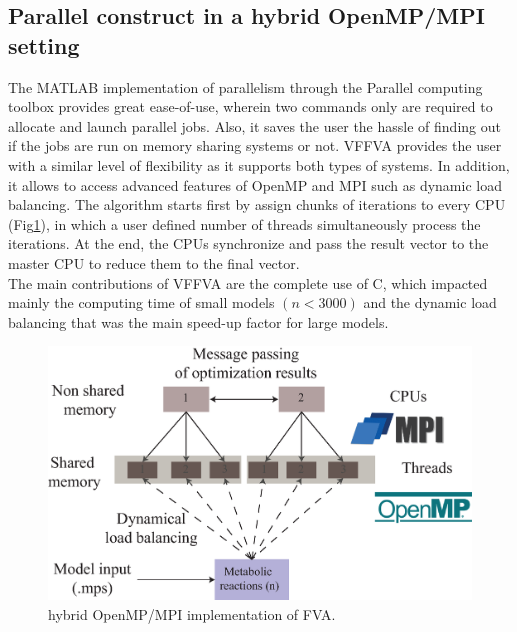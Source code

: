 \documentclass[letterpaper, 10 pt, conference]{ieeeconf}  %
\begin{document}
\subsection{Parallel construct in a hybrid OpenMP/MPI setting} 
The MATLAB implementation of parallelism through the Parallel computing toolbox provides great ease-of-use, wherein two commands only are required to allocate and launch parallel jobs. Also, it saves the user the hassle of finding out if the jobs are run on memory sharing systems or not. VFFVA provides the user with a similar level of flexibility as it supports both types of systems. In addition, it allows to access advanced features of OpenMP and MPI such as dynamic load balancing. The algorithm starts first by assign chunks of iterations to every CPU (Fig\ref{fig:hybrid.}), in which a user defined number of threads simultaneously process the iterations. At the end, the CPUs synchronize and pass the result vector to the master CPU to reduce them to the final vector. \\
The main contributions of VFFVA are the complete use of C, which impacted mainly the computing time of small models $(n<3000)$ and the dynamic load balancing that was the main speed-up factor for large models.

\begin{figure}[!htb]
\centering
\includegraphics[scale=.3]{figures/figure1/scheme.eps}
\caption{hybrid OpenMP/MPI implementation of FVA.}
\label{fig:hybrid.}
\end{figure}
\end{document}
